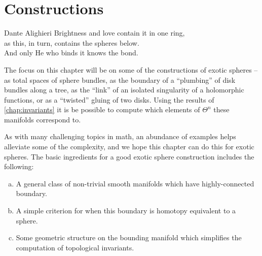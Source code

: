 \chapter{Constructions}\label{chap:constructions}
%


\begin{epigraph}{19em}{Dante Alighieri}
Brightness and love contain it in one ring,\\
as this, in turn, contains the spheres below.\\
And only He who binds it knows the bond.
\end{epigraph}

The focus on this chapter will be on some of the constructions of exotic spheres -- as total spaces of sphere bundles, as the boundary of a ``plumbing'' of disk bundles along a tree, as the ``link'' of an isolated singularity of a holomorphic functions, or as a ``twisted'' gluing of two disks. Using the results of \cref{chap:invariants} it is be possible to compute which elements of $\Theta^n$ these manifolds correspond to.

As with many challenging topics in math, an abundance of examples helps alleviate some of the complexity, and we hope this chapter can do this for exotic spheres.
The basic ingredients for a good exotic sphere construction includes the following:
\begin{enumerate}[(a)]
	\item A general class of non-trivial smooth manifolds which have highly-connected boundary.
	\item A simple criterion for when this boundary is homotopy equivalent to a sphere.
	\item Some geometric structure on the bounding manifold which simplifies the computation of topological invariants.
\end{enumerate}





